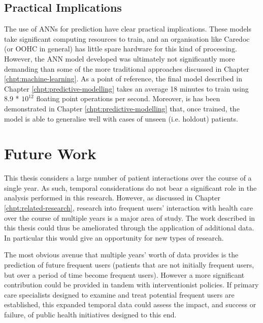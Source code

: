 \subsection{Practical Implications}

The use of ANNs for prediction have clear practical implications. These models take significant computing resources to train, and an organisation like Caredoc (or OOHC in general) has little spare hardware for this kind of processing. However, the ANN model developed was ultimately not significantly more demanding than some of the more traditional approaches discussed in Chapter \ref{chpt:machine-learning}. As a point of reference, the final model described in Chapter \ref{chpt:predictive-modelling} takes an average 18 minutes to train using 8.9 * $10^{12}$ floating point operations per second. Moreover, is has been demonstrated in Chapter \ref{chpt:predictive-modelling} that, once trained, the model is able to generalise well with cases of unseen (i.e. holdout) patients. 



\section{Future Work}

This thesis considers a large number of patient interactions over the course of a single year. As such, temporal considerations do not bear a significant role in the analysis performed in this research. However, as discussed in Chapter \ref{chpt:related-research}, research into frequent users' interaction with health care over the course of multiple years is a major area of study. The work described in this thesis could thus be ameliorated through the application of additional data. In particular this would give an opportunity for new types of research.



The most obvious avenue that multiple years' worth of data provides is the prediction of future frequent users (patients that are not initially frequent users, but over a period of time become frequent users). However a more significant contribution could be provided in tandem with interventionist policies. If primary care specialists designed to examine and treat potential frequent users are established, this expanded temporal data could assess the impact, and success or failure, of public health initiatives designed to this end. 

